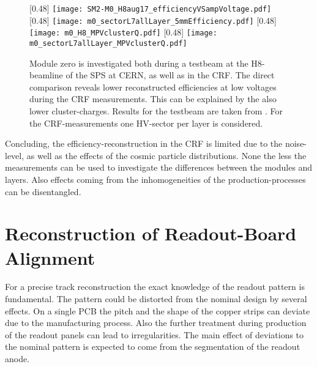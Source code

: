 \documentclass[
twoside,            %
BCOR1.4cm,          %
10pt,               %
headings=normal,    %
headsepline,        %
clearplainpage,		%
final,              %
div=14,
open=right,
bibliography=toc
]{scrreprt}
\begin{document}
\begin{figure}[!h]
	\centering
	[0.48\textwidth]
	{\texttt{[image: SM2-M0\_H8aug17\_efficiencyVSampVoltage.pdf]}}
	\hfill
	[0.48\textwidth]
	{\texttt{[image: m0\_sectorL7allLayer\_5mmEfficiency.pdf]}}
	\hfill
	[0.48\textwidth]
	{\texttt{[image: m0\_H8\_MPVclusterQ.pdf]}}
	\hfill
	[0.48\textwidth]
	{\texttt{[image: m0\_sectorL7allLayer\_MPVclusterQ.pdf]}}
	\vspace{-2mm}
	\caption{
		Module zero is investigated both during a testbeam at the H8-beamline of the SPS at CERN, as well as in the CRF.
		The direct comparison reveals lower reconstructed efficiencies at low voltages during the CRF measurements.
		This can be explained by the also lower cluster-charges.
		Results for the testbeam are taken from \cite{flierlThesis}.
		For the CRF-measurements one HV-sector per layer is considered.
	}
	\label{moduleZero} 
	\vspace{-2mm}
\end{figure}

Concluding, the efficiency-reconstruction in the CRF is limited due to the noise-level, as well as the effects of the cosmic particle distributions.
None the less the measurements can be used to investigate the differences between the modules and layers.
Also effects coming from the inhomogeneities of the production-processes can be disentangled.

\chapter{Reconstruction of Readout-Board Alignment}

For a precise track reconstruction the exact knowledge of the readout pattern is fundamental.
The pattern could be distorted from the nominal design by several effects.
On a single PCB the pitch and the shape of the copper strips can deviate due to the manufacturing process. 
Also the further treatment during production of the readout panels can lead to irregularities.
The main effect of deviations to the nominal pattern is expected to come from the segmentation of the readout anode.
\end{document}
